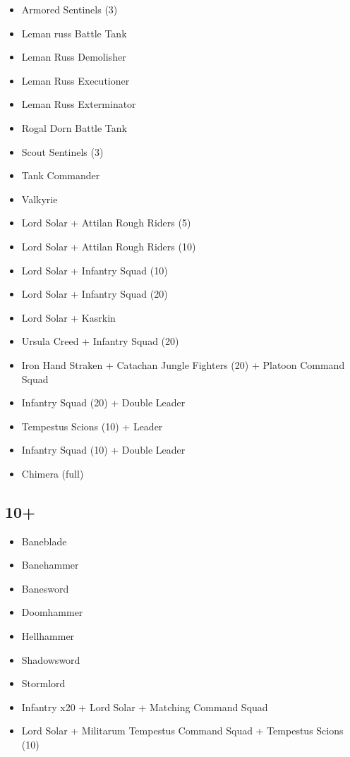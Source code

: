 \documentclass{HordeModeTarot}
\begin{document}
\begin{multicols}{2}
\begin{itemize}[leftmargin=*]
\item[] Armored Sentinels (3)
\item[] Leman russ Battle Tank
\item[] Leman Russ Demolisher
\item[] Leman Russ Executioner
\item[] Leman Russ Exterminator
\item[] Rogal Dorn Battle Tank
\item[] Scout Sentinels (3)
\item[] Tank Commander
\item[] Valkyrie
\item[] Lord Solar + Attilan Rough Riders (5)
\item[] Lord Solar + Attilan Rough Riders (10)
\item[] Lord Solar + Infantry Squad (10)
\item[] Lord Solar + Infantry Squad (20)
\item[] Lord Solar + Kasrkin
\item[] Ursula Creed + Infantry Squad (20)
\item[] Iron Hand Straken + Catachan Jungle Fighters (20) + Platoon Command Squad
\item[] Infantry Squad (20) + Double Leader
\item[] Tempestus Scions (10) + Leader
\item[] Infantry Squad (10) + Double Leader
\item[] Chimera (full)
\end{itemize}

\subsection*{10+}

\begin{itemize}[leftmargin=*]
\item[] Baneblade
\item[] Banehammer
\item[] Banesword
\item[] Doomhammer
\item[] Hellhammer
\item[] Shadowsword
\item[] Stormlord
\item[] Infantry x20 + Lord Solar + Matching Command Squad
\item[] Lord Solar + Militarum Tempestus Command Squad + Tempestus Scions (10)
\end{itemize}


\end{multicols}
\end{document}
